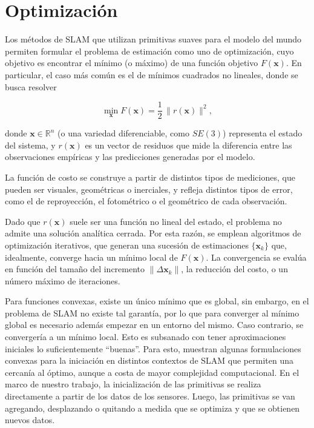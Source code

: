 \section{Optimización}
Los métodos de SLAM que utilizan primitivas suaves para el modelo del mundo permiten formular el problema de estimación como uno de optimización, cuyo objetivo es encontrar el mínimo (o máximo) de una función objetivo $F(\mathbf{x})$. En particular, el caso más común es el de mínimos cuadrados no lineales, donde se busca resolver

$$
\min_{\mathbf{x}} F(\mathbf{x}) = \frac{1}{2}\,\|r(\mathbf{x})\|^2,
$$

\noindent donde $\mathbf{x} \in \mathbb{R}^n$ (o una variedad diferenciable, como $SE(3)$) representa el estado del sistema, y $r(\mathbf{x})$ es un vector de residuos que mide la diferencia entre las observaciones empíricas y las predicciones generadas por el modelo.

La función de costo se construye a partir de distintos tipos de mediciones, que pueden ser visuales, geométricas o inerciales, y refleja distintos tipos de error, como el de reproyección, el fotométrico o el geométrico de cada observación.

Dado que $r(\mathbf{x})$ suele ser una función no lineal del estado, el problema no admite una solución analítica cerrada. Por esta razón, se emplean algoritmos de optimización iterativos, que generan una sucesión de estimaciones $\{\mathbf{x}_k\}$ que, idealmente, converge hacia un mínimo local de $F(\mathbf{x})$. La convergencia se evalúa en función del tamaño del incremento $\|\Delta \mathbf{x}_k\|$, la reducción del costo, o un número máximo de iteraciones.

Para funciones convexas, existe un único mínimo que es global, sin embargo, en el problema de SLAM no existe tal garantía, por lo que para converger al mínimo global es necesario además empezar en un entorno del mismo. Caso contrario, se convergería a un mínimo local. Esto es subsanado con tener aproximaciones iniciales lo suficientemente ``buenas''. Para esto, \cite{papalia2023score} \cite{liu2012convex} muestran algunas formulaciones convexas para la iniciación en distintos contextos de SLAM que permiten una cercanía al óptimo, aunque a costa de mayor complejidad computacional. En el marco de nuestro trabajo, la inicialización de las primitivas se realiza directamente a partir de los datos de los sensores. Luego, las primitivas se van agregando, desplazando o quitando a medida que se optimiza y que se obtienen nuevos datos.

